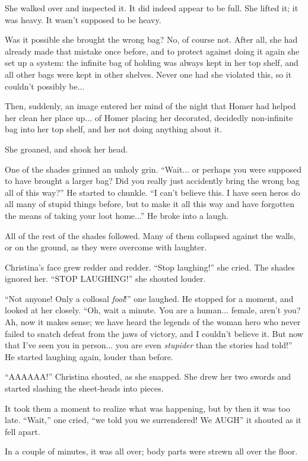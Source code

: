 \documentclass[showtrims,b6paper,draft,10pt]{memoir}
\begin{document}
She walked over and inspected it.  It did indeed appear to be full.  She lifted it;  it was heavy.  It wasn't supposed to be heavy.

Was it possible she brought the wrong bag?  No, of course not.  After all, she had already made that mistake once before, and to protect against doing it again she set up a system:  the infinite bag of holding was always kept in her top shelf, and all other bags were kept in other shelves.  Never one had she violated this, so it couldn't possibly be...

Then, suddenly, an image entered her mind of the night that Homer had helped her clean her place up... of Homer placing her decorated, decidedly non-infinite bag into her top shelf, and her not doing anything about it.

She groaned, and shook her head.

One of the shades grinned an unholy grin.  ``Wait... or perhaps you were supposed to have brought a larger bag?  Did you really just accidently bring the wrong bag all of this way?''  He started to chunkle.  ``I can't believe this.  I have seen heros do all many of stupid things before, but to make it all this way and have forgotten the means of taking your loot home...''  He broke into a laugh.

All of the rest of the shades followed.  Many of them collapsed against the walls, or on the ground, as they were overcome with laughter.

Christina's face grew redder and redder.  ``Stop laughing!'' she cried.  The shades ignored her.  ``STOP LAUGHING!'' she shouted louder.

``Not anyone!  Only a collosal \emph{fool}!''  one laughed.  He stopped for a moment, and looked at her closely.  ``Oh, wait a minute.  You are a human... female, aren't you?  Ah, now it makes sense;  we have heard the legends of the woman hero who never failed to snatch defeat from the jaws of victory, and I couldn't believe it.  But now that I've seen you in person... you are even \emph{stupider} than the stories had told!''  He started laughing again, louder than before.

``AAAAAA!'' Christina shouted, as she snapped.  She drew her two swords and started slashing the sheet-heads into pieces.

It took them a moment to realize what was happening, but by then it was too late.  ``Wait,'' one cried, ``we told you we surrendered!  We AUGH'' it shouted as it fell apart.

In a couple of minutes, it was all over;  body parts were strewn all over the floor.
\end{document}
